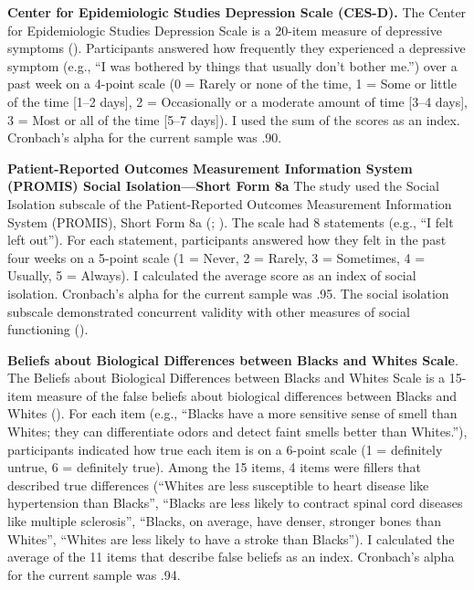 \documentclass[
]{udthesis}
\begin{document}
\textbf{Center for Epidemiologic Studies Depression Scale (CES-D).} The Center for Epidemiologic Studies Depression Scale is a 20-item measure of depressive symptoms (). Participants answered how frequently they experienced a depressive symptom (e.g., ``I was bothered by things that usually don't bother me.'') over a past week on a 4-point scale (0 = Rarely or none of the time, 1 = Some or little of the time {[}1--2 days{]}, 2 = Occasionally or a moderate amount of time {[}3--4 days{]}, 3 = Most or all of the time {[}5--7 days{]}). I used the sum of the scores as an index. Cronbach's alpha for the current sample was .90.

\textbf{Patient-Reported Outcomes Measurement Information System (PROMIS) Social Isolation---Short Form 8a} The study used the Social Isolation subscale of the Patient-Reported Outcomes Measurement Information System (PROMIS), Short Form 8a (; ). The scale had 8 statements (e.g., ``I felt left out''). For each statement, participants answered how they felt in the past four weeks on a 5-point scale (1 = Never, 2 = Rarely, 3 = Sometimes, 4 = Usually, 5 = Always). I calculated the average score as an index of social isolation. Cronbach's alpha for the current sample was .95. The social isolation subscale demonstrated concurrent validity with other measures of social functioning ().

\textbf{Beliefs about Biological Differences between Blacks and Whites Scale}. The Beliefs about Biological Differences between Blacks and Whites Scale is a 15-item measure of the false beliefs about biological differences between Blacks and Whites (). For each item (e.g., ``Blacks have a more sensitive sense of smell than Whites; they can differentiate odors and detect faint smells better than Whites.''), participants indicated how true each item is on a 6-point scale (1 = definitely untrue, 6 = definitely true). Among the 15 items, 4 items were fillers that described true differences (``Whites are less susceptible to heart disease like hypertension than Blacks'', ``Blacks are less likely to contract spinal cord diseases like multiple sclerosis'', ``Blacks, on average, have denser, stronger bones than Whites'', ``Whites are less likely to have a stroke than Blacks''). I calculated the average of the 11 items that describe false beliefs as an index. Cronbach's alpha for the current sample was .94.
\end{document}
